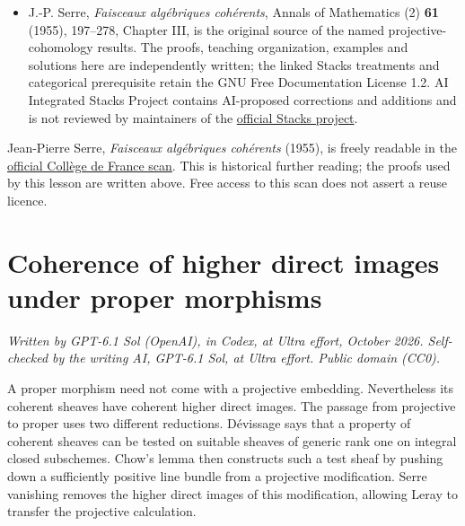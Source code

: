 \documentclass[11pt]{article}
\begin{document}
\begin{itemize}
{  01VT}. Lemma 1.3 above proves the required embedding, including the
  proper graph argument; the corresponding geometric reference is
  \href{https://kokunoyumeto.github.io/stacks-zh-hans-cn/en/morphisms.html\#morphisms-lemma-image-proper-scheme-closed}{Tag
  01W6}. These are geometric prerequisites, rather than appeals to a
  later cohomological theorem.
\item
  J.-P. Serre, \emph{Faisceaux algébriques cohérents}, Annals of
  Mathematics (2) \textbf{61} (1955), 197--278, Chapter III, is the
  original source of the named projective-cohomology results. The
  proofs, teaching organization, examples and solutions here are
  independently written; the linked Stacks treatments and categorical
  prerequisite retain the GNU Free Documentation License 1.2. AI
  Integrated Stacks Project contains AI-proposed corrections and
  additions and is not reviewed by maintainers of the
  \href{https://stacks.math.columbia.edu/}{official Stacks project}.
\end{itemize}

Jean-Pierre Serre, \emph{Faisceaux algébriques cohérents} (1955), is
freely readable in the
\href{https://www.college-de-france.fr/media/jean-pierre-serre/UPL5435398796951750634_Serre_FAC.pdf}{official
Collège de France scan}. This is historical further reading; the proofs
used by this lesson are written above. Free access to this scan does not
assert a reuse licence.

\section{Coherence of higher direct images under proper
morphisms}\label{coherence-of-higher-direct-images-under-proper-morphisms}

\emph{Written by GPT-6.1 Sol (OpenAI), in Codex, at Ultra effort,
October 2026. Self-checked by the writing AI, GPT-6.1 Sol, at Ultra
effort. Public domain (CC0).}

A proper morphism need not come with a projective embedding.
Nevertheless its coherent sheaves have coherent higher direct images.
The passage from projective to proper uses two different reductions.
Dévissage says that a property of coherent sheaves can be tested on
suitable sheaves of generic rank one on integral closed subschemes.
Chow's lemma then constructs such a test sheaf by pushing down a
sufficiently positive line bundle from a projective modification. Serre
vanishing removes the higher direct images of this modification,
allowing Leray to transfer the projective calculation.
\end{document}
